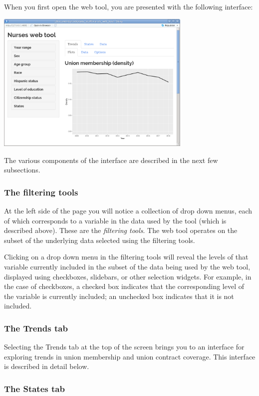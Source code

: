 \documentclass[letterpaper,12pt]{article}
\begin{document}
When you first open the web tool, you are presented with the following
interface:
\begin{center}
  \includegraphics[width=0.7\textwidth]{images/opening_interface.png}
\end{center}
The various components of the interface are described in the next few
subsections.

\subsubsection{The filtering tools}

At the left side of the page you will notice a collection of drop down
menus, each of which corresponds to a variable in the data used by the
tool (which is described above). These are the \textit{filtering
 tools}. The web tool operates on the subset of the underlying data
selected using the filtering tools.

Clicking on a drop down menu in the filtering tools will reveal the
levels of that variable currently included in the subset of the data
being used by the web tool, displayed using checkboxes, slidebars, or
other selection widgets. For example, in the case of checkboxes, a
checked box indicates that the corresponding level of the variable is
currently included; an unchecked box indicates that it is not
included.

\subsubsection{The Trends tab}

Selecting the Trends tab at the top of the screen brings you to an
interface for exploring trends in union membership and union contract
coverage. This interface is described in detail below.

\subsubsection{The States tab}
\end{document}
